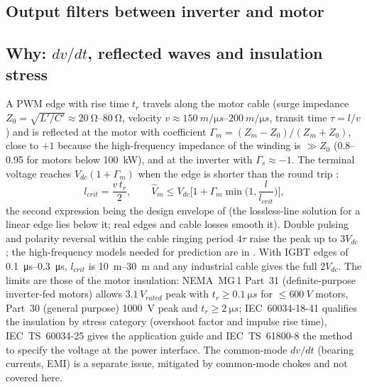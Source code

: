 \documentclass[10pt,a4paper]{scrartcl}
\newcommand{\Vdc}{V_{dc}}
\begin{document}
\begin{onehalfspace}
\section{Output filters between inverter and motor}
\label{sec:motor}

\subsection{Why: $dv/dt$, reflected waves and insulation stress}
A PWM edge with rise time $t_r$ travels along the motor cable (surge impedance $Z_0 = \sqrt{L'/C'} \approx \SIrange{20}{80}{\ohm}$, velocity $v \approx \SIrange{150}{200}{m/\micro s}$, transit time $\tau = l/v$) and is reflected at the motor with coefficient $\Gamma_m = (Z_m - Z_0)/(Z_m + Z_0)$, close to $+1$ because the high-frequency impedance of the winding is $\gg Z_0$ (\SIrange{0.8}{0.95}{} for motors below \SI{100}{kW}), and at the inverter with $\Gamma_s \approx -1$. The terminal voltage reaches $\Vdc(1 + \Gamma_m)$ when the edge is shorter than the round trip \cite{persson1992,vonjouanne1996}:
\begin{equation}
l_{crit} = \frac{v\,t_r}{2},\qquad
\hat V_m \le \Vdc\Big[1 + \Gamma_m\min\Big(1, \frac{l}{l_{crit}}\Big)\Big],
\label{eq:lcrit}
\end{equation}
the second expression being the design envelope of \cite{vonjouanne1997} (the lossless-line solution for a linear edge lies below it; real edges and cable losses smooth it). Double pulsing and polarity reversal within the cable ringing period $4\tau$ raise the peak up to $3\Vdc$ \cite{kerkman1997}; the high-frequency models needed for prediction are in \cite{moreira2002}. With IGBT edges of \SIrange{0.1}{0.3}{\micro s}, $l_{crit}$ is \SIrange{10}{30}{m} and any industrial cable gives the full $2\Vdc$. The limits are those of the motor insulation: NEMA~MG\,1 Part~31 \cite{nema} (definite-purpose inverter-fed motors) allows $3.1\,V_{rated}$ peak with $t_r \ge \SI{0.1}{\micro s}$ for $\le \SI{600}{V}$ motors, Part~30 (general purpose) \SI{1000}{V} peak and $t_r \ge \SI{2}{\micro s}$; IEC~60034-18-41 \cite{iec60034-18-41} qualifies the insulation by stress category (overshoot factor and impulse rise time), IEC~TS~60034-25 \cite{iec60034-25} gives the application guide and IEC~TS~61800-8 \cite{iec61800-8} the method to specify the voltage at the power interface. The common-mode $dv/dt$ (bearing currents, EMI) is a separate issue, mitigated by common-mode chokes and not covered here.


\end{onehalfspace}
\end{document}
